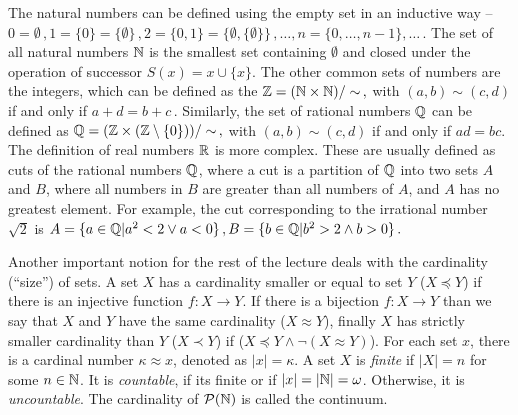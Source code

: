 The natural numbers can be defined using the empty set in an inductive way -- $0 = \emptyset\,,1=\{0\} = \{\emptyset\}\,, 2=\{0,1\} = \{\emptyset, \{\emptyset\}\}\,, \dots, n=\{0, \dots, n-1\}, \dots\,.$ The set of all natural numbers $\mathbb{N}$ is the smallest set containing $\emptyset$ and closed under the operation of successor $S(x) = x \cup \{x\}$. The other common sets of numbers are the integers, which can be defined as the $\mathbb{Z} = (\mathbb{N} \times \mathbb{N})/\sim\,,$ with $(a,b) \sim (c,d)$ if and only if $a + d = b + c\,.$ Similarly, the set of rational numbers $\mathbb{Q}$ can be defined as $\mathbb{Q} = (\mathbb{Z} \times (\mathbb{Z} \setminus \{0\}))/\sim\,,$ with $(a,b) \sim (c,d)$ if and only if $ad=bc$. The definition of real numbers ${\mathbb{R}}$ is more complex. These are usually defined as cuts of the rational numbers $\mathbb{Q}$, where a cut is a partition of $\mathbb{Q}$ into two sets $A$ and $B$, where all numbers in $B$ are greater than all numbers of $A$, and $A$ has no greatest element. For example, the cut corresponding to the irrational number $\sqrt{2}$ is $A = \{a\in \mathbb{Q} | a^2 < 2 \lor a < 0\}\,, B = \{b\in \mathbb{Q} | b^2 > 2 \land b > 0\}\,.$

Another important notion for the rest of the lecture deals with the cardinality (``size'') of sets. A set $X$ has a cardinality smaller or equal to set $Y$ ($X \preceq Y$) if there is an injective function $f: X \to Y$. If there is a bijection $f: X \to Y$ than we say that $X$ and $Y$ have the same cardinality ($X \approx Y$), finally $X$ has strictly smaller cardinality than $Y$ ($X \prec Y$) if ($X \preceq Y \land \neg(X \approx Y)$). For each set $x$, there is a cardinal number $\kappa \approx x$, denoted as $|x| = \kappa$. A set $X$ is \emph{finite} if $|X| = n$ for some $n \in \mathbb{N}$. It is \emph{countable}, if its finite or if $|x| = |\mathbb{N}| = \omega$. Otherwise, it is \emph{uncountable}. The cardinality of $\mathcal{P}(\mathbb{N})$ is called the continuum.

